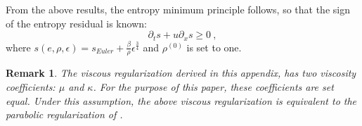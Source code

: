 \documentclass[review]{elsarticle}
\newtheorem{remark}{Remark}[section]
\newcommand{\sect}[1]{Section~\ref{#1}}                     %
\begin{document}
\begin{appendices}
From the above results, the entropy minimum principle follows, so that the sign of the entropy residual is known:
\begin{equation}
\boxed{\partial_t s + u \partial_x s \geq 0} \ ,
\end{equation}
where $s\left( e, \rho, \epsilon \right) = s_{Euler} + \frac{\beta}{\rho} \epsilon^\frac{3}{4}$ and $\rho^{(0)}$ is set to one.
\begin{remark}
The viscous regularization derived in this appendix, has two viscosity coefficients: $\mu$ and $\kappa$. For the purpose of this paper, these coefficients are set equal. Under this assumption, the above viscous regularization is equivalent to the parabolic regularization of \cite{Parabolic}.
\end{remark}
\end{appendices}
\end{document}
